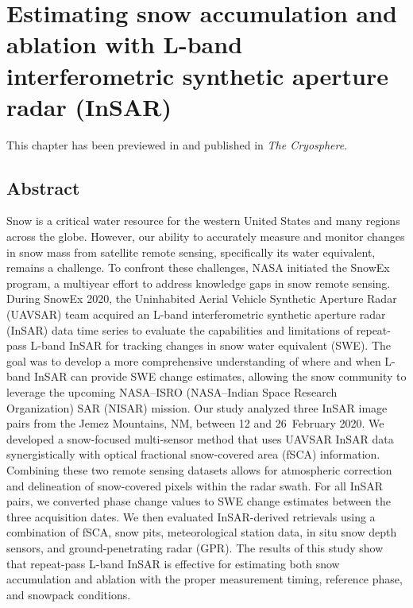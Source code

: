 \hypertarget{ch3}{%
\chapter{Estimating snow accumulation and ablation with L-band interferometric synthetic aperture radar (InSAR)}\label{ch3}}

This chapter has been previewed in and published in \emph{The Cryosphere}.



\hypertarget{ch3-abstract}{\section{Abstract}\label{ch3-abstract}}
Snow is a critical water resource for the western United States and many regions across the globe. However, our ability to accurately measure and monitor changes in snow mass from satellite remote sensing, specifically its water equivalent, remains a challenge. To confront these challenges, NASA initiated the SnowEx program, a multiyear effort to address knowledge gaps in snow remote sensing. During SnowEx 2020, the Uninhabited Aerial Vehicle Synthetic Aperture Radar (UAVSAR) team acquired an L-band interferometric synthetic aperture radar (InSAR) data time series to evaluate the capabilities and limitations of repeat-pass L-band InSAR for tracking changes in snow water equivalent (SWE). The goal was to develop a more comprehensive understanding of where and when L-band InSAR can provide SWE change estimates, allowing the snow community to leverage the upcoming NASA--ISRO (NASA--Indian Space Research Organization) SAR (NISAR) mission. Our study analyzed three InSAR image pairs from the Jemez Mountains, NM, between 12 and 26~February 2020. We developed a snow-focused multi-sensor method that uses UAVSAR InSAR data synergistically with optical fractional snow-covered area (fSCA) information. Combining these two remote sensing datasets allows for atmospheric correction and delineation of snow-covered pixels within the radar swath. For all InSAR pairs, we converted phase change values to SWE change estimates between the three acquisition dates. We then evaluated InSAR-derived retrievals using a combination of fSCA, snow pits, meteorological station data, in situ snow depth sensors, and ground-penetrating radar (GPR). The results of this study show that repeat-pass L-band InSAR is effective for estimating both snow accumulation and ablation with the proper measurement timing, reference phase, and snowpack conditions.

